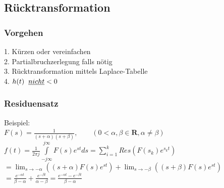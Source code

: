 \newpage
\renewcommand{\arraystretch}{\arraystretchOriginal}		
	\subsection{Rücktransformation }
		\subsubsection{Vorgehen}
				1. Kürzen oder vereinfachen \\
				2. Partialbruchzerlegung falls nötig \\
				3. Rücktransformation mittels Laplace-Tabelle \\
				4. $h(t)\hspace{0.2cm}\underline{nicht} < 0$ \\
			
		\subsubsection{Residuensatz}
			Beispiel:\\
			$F(s) = \frac{1}{(s+\alpha)(s+\beta)}, \qquad (0 < \alpha,\beta \in \mathbf{R}, \alpha \neq \beta)$\\
			$f(t) = \frac{1}{2\pi j} \int\limits_{-j\infty}^{j\infty} F(s)e^{st} ds = \sum\limits_{i=1}^k Res(F(s_k)e^{s_kt})$\\
			$=\lim_{s \to -\alpha} ((s+\alpha)F(s)e^{st}) + \lim_{s \to -\beta}((s+\beta)F(s)e^{st})$\\
			$=\frac{e^{-\alpha t}}{\beta - \alpha} + \frac{e^{-\beta t}}{\alpha - \beta} = \frac{e^{-\alpha t}-e^{-\beta t}}{\beta - \alpha}$
			
			
